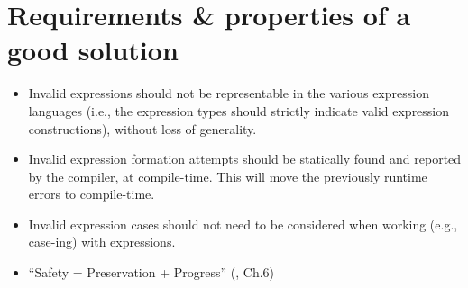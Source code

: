 \section{Requirements \& properties of a good solution}

\begin{itemize}

      \item Invalid expressions should not be representable in the various
            expression languages (i.e., the expression types should strictly
            indicate valid expression constructions), without loss of
            generality.

      \item Invalid expression formation attempts should be statically found and
            reported by the compiler, at compile-time. This will move the
            previously runtime errors to compile-time.

      \item Invalid expression cases should not need to be considered when
            working (e.g., case-ing) with expressions.

      \item ``Safety = Preservation + Progress'' (\cite{Harper2016}, Ch.6)

\end{itemize}
